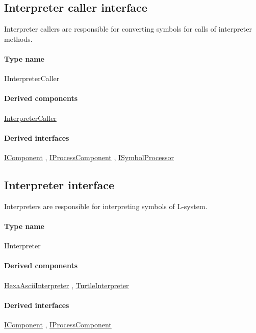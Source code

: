 
\subsection{Interpreter caller interface}
\label{Malsys.Processing.Components.IInterpreterCaller}
Interpreter callers are responsible for converting symbols for calls of interpreter methods.\paragraph{Type name}
IInterpreterCaller	\paragraph{Derived components}
		\hyperref[Malsys.Processing.Components.Interpreters.InterpreterCaller]{InterpreterCaller}%
	\paragraph{Derived interfaces}
		\hyperref[Malsys.Processing.Components.IComponent]{IComponent}%
, 		\hyperref[Malsys.Processing.Components.IProcessComponent]{IProcessComponent}%
, 		\hyperref[Malsys.Processing.Components.ISymbolProcessor]{ISymbolProcessor}%
	

\subsection{Interpreter interface}
\label{Malsys.Processing.Components.IInterpreter}
Interpreters are responsible for interpreting symbols of L-system.\paragraph{Type name}
IInterpreter	\paragraph{Derived components}
		\hyperref[Malsys.Processing.Components.Interpreters.HexaAsciiInterpreter]{HexaAsciiInterpreter}%
, 		\hyperref[Malsys.Processing.Components.Interpreters.TurtleInterpreter]{TurtleInterpreter}%
	\paragraph{Derived interfaces}
		\hyperref[Malsys.Processing.Components.IComponent]{IComponent}%
, 		\hyperref[Malsys.Processing.Components.IProcessComponent]{IProcessComponent}%
